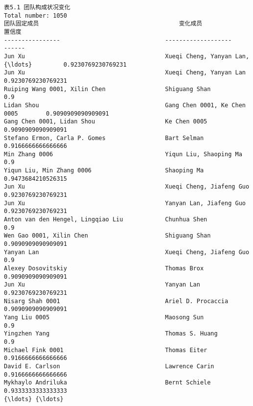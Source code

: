 \documentclass[11pt]{article}
\begin{document}
    \begin{Verbatim}[commandchars=\\\{\}]
                          表5.1 团队构成状况变化                      
Total number: 1050
团队固定成员                                        变化成员                         置信度       
----------------                              -------------------                 ------         
Jun Xu                                        Xueqi Cheng, Yanyan Lan,{\ldots}         0.9230769230769231
Jun Xu                                        Xueqi Cheng, Yanyan Lan             0.9230769230769231
Ruiping Wang 0001, Xilin Chen                 Shiguang Shan                       0.9            
Lidan Shou                                    Gang Chen 0001, Ke Chen 0005        0.9090909090909091
Gang Chen 0001, Lidan Shou                    Ke Chen 0005                        0.9090909090909091
Stefano Ermon, Carla P. Gomes                 Bart Selman                         0.9166666666666666
Min Zhang 0006                                Yiqun Liu, Shaoping Ma              0.9            
Yiqun Liu, Min Zhang 0006                     Shaoping Ma                         0.9473684210526315
Jun Xu                                        Xueqi Cheng, Jiafeng Guo            0.9230769230769231
Jun Xu                                        Yanyan Lan, Jiafeng Guo             0.9230769230769231
Anton van den Hengel, Lingqiao Liu            Chunhua Shen                        0.9            
Wen Gao 0001, Xilin Chen                      Shiguang Shan                       0.9090909090909091
Yanyan Lan                                    Xueqi Cheng, Jiafeng Guo            0.9            
Alexey Dosovitskiy                            Thomas Brox                         0.9090909090909091
Jun Xu                                        Yanyan Lan                          0.9230769230769231
Nisarg Shah 0001                              Ariel D. Procaccia                  0.9090909090909091
Yang Liu 0005                                 Maosong Sun                         0.9            
Yingzhen Yang                                 Thomas S. Huang                     0.9            
Michael Fink 0001                             Thomas Eiter                        0.9166666666666666
David E. Carlson                              Lawrence Carin                      0.9166666666666666
Mykhaylo Andriluka                            Bernt Schiele                       0.9333333333333333
{\ldots} {\ldots}

    \end{Verbatim}
\end{document}
